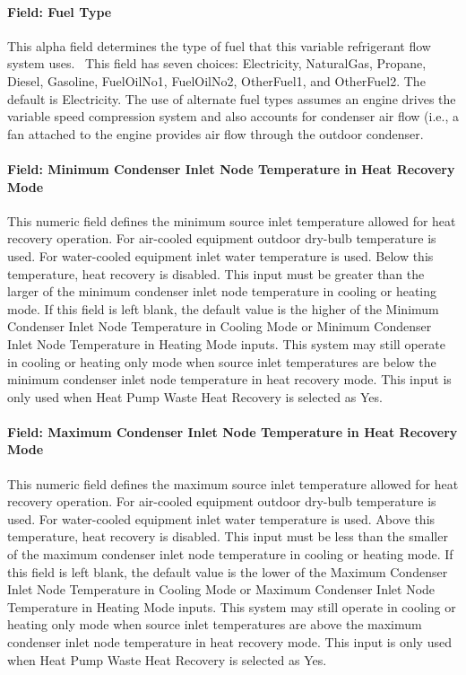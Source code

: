 \paragraph{Field: Fuel Type}\label{field-fuel-type-005}

This alpha field determines the type of fuel that this variable refrigerant flow system uses.~ This field has seven choices: Electricity, NaturalGas, Propane, Diesel, Gasoline, FuelOilNo1, FuelOilNo2, OtherFuel1, and OtherFuel2. The default is Electricity. The use of alternate fuel types assumes an engine drives the variable speed compression system and also accounts for condenser air flow (i.e., a fan attached to the engine provides air flow through the outdoor condenser.

\paragraph{Field: Minimum Condenser Inlet Node Temperature in Heat Recovery Mode}\label{field-minimum-condenser-inlet-node-temperature-in-heat-recovery-mode-000}

This numeric field defines the minimum source inlet temperature allowed for heat recovery operation. For air-cooled equipment outdoor dry-bulb temperature is used. For water-cooled equipment inlet water temperature is used. Below this temperature, heat recovery is disabled. This input must be greater than the larger of the minimum condenser inlet node temperature in cooling or heating mode. If this field is left blank, the default value is the higher of the Minimum Condenser Inlet Node Temperature in Cooling Mode or Minimum Condenser Inlet Node Temperature in Heating Mode inputs. This system may still operate in cooling or heating only mode when source inlet temperatures are below the minimum condenser inlet node temperature in heat recovery mode. This input is only used when Heat Pump Waste Heat Recovery is selected as Yes.

\paragraph{Field: Maximum Condenser Inlet Node Temperature in Heat Recovery Mode}\label{field-maximum-condenser-inlet-node-temperature-in-heat-recovery-mode-000}

This numeric field defines the maximum source inlet temperature allowed for heat recovery operation. For air-cooled equipment outdoor dry-bulb temperature is used. For water-cooled equipment inlet water temperature is used. Above this temperature, heat recovery is disabled. This input must be less than the smaller of the maximum condenser inlet node temperature in cooling or heating mode. If this field is left blank, the default value is the lower of the Maximum Condenser Inlet Node Temperature in Cooling Mode or Maximum Condenser Inlet Node Temperature in Heating Mode inputs. This system may still operate in cooling or heating only mode when source inlet temperatures are above the maximum condenser inlet node temperature in heat recovery mode. This input is only used when Heat Pump Waste Heat Recovery is selected as Yes.


